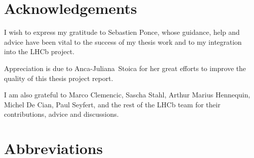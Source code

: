 \documentclass[12pt]{article}
\begin{document}
\newpage
\section*{Acknowledgements}

I wish to express my gratitude to Sebastien Ponce, whose guidance, help and advice have been vital to the success of my thesis work and to my integration into the LHCb project.

\noindent Appreciation is due to Anca-Juliana Stoica for her great efforts to improve the quality of this thesis project report.

\noindent I am also grateful to Marco Clemencic, Sascha Stahl, Arthur Marius Hennequin, Michel De Cian, Paul Seyfert, and the rest of the LHCb team for their contributions, advice and discussions.



\newpage
{
	\small
	\hypersetup{linkcolor=black}
	\tableofcontents
}

\newpage
{
	\small
	\hypersetup{linkcolor=black}
	\listoffigures
}

\newpage
{
	\small
	\hypersetup{linkcolor=black}
	\listoftables
}

{
	\small
	\renewcommand\lstlistlistingname{Code Listings}
	\hypersetup{linkcolor=black}
	\lstlistoflistings
}


\section*{Abbreviations}
\end{document}
